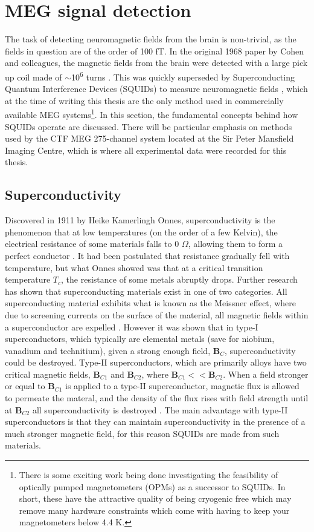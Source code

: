 \section{MEG signal detection}\label{sec_SQUIDS}
The task of detecting neuromagnetic fields from the brain is non-trivial, as the fields in question are of the order of 100 fT. In the original 1968 paper by Cohen and colleagues, the magnetic fields from the brain were detected with a large pick up coil made of $\sim$10\textsuperscript{6} turns \citep{Cohen1968}. This was quickly superseded by Superconducting Quantum Interference Devices (SQUIDs) to measure neuromagnetic fields \citep{Cohen1972}, which at the time of writing this thesis are the only method used in commercially available MEG systems\footnote{There is some exciting work being done investigating the feasibility of optically pumped magnetometers (OPMs) as a successor to SQUIDs. In short, these have the attractive quality of being cryogenic free which may remove many hardware constraints which come with having to keep your magnetometers below 4.4 K.}. In this section, the fundamental concepts behind how SQUIDs operate are discussed. There will be particular emphasis on methods used by the CTF MEG 275-channel system located at the Sir Peter Mansfield Imaging Centre, which is where all experimental data were recorded for this thesis.  

\subsection{Superconductivity}
Discovered in 1911 by Heike Kamerlingh Onnes, superconductivity is the phenomenon that at low temperatures (on the order of a few Kelvin), the electrical resistance of some materials falls to 0 $\Omega$, allowing them to form a perfect conductor \citep{Onnes1911}. It had been postulated that resistance gradually fell with temperature, but what Onnes showed was that at a critical transition temperature $T_c$, the resistance of some metals abruptly drops. Further research has shown that superconducting materials exist in one of two categories. All superconducting material exhibits what is known as the Meissner effect, where due to screening currents on the surface of the material, all magnetic fields within a superconductor are expelled \citep{Meissner1933}. However it was shown that in type-I superconductors, which typically are elemental metals (save for niobium, vanadium and technitium), given a strong enough field, $\mathbf{B}_C$, superconductivity could be destroyed. Type-II superconductors, which are primarily alloys have two critical magnetic fields, $\mathbf{B}_{C1}$ and $\mathbf{B}_{C2}$, where $\mathbf{B}_{C1} << \mathbf{B}_{C2}$. When a field stronger or equal to $\mathbf{B}_{C1}$ is applied to a type-II superconductor, magnetic flux is allowed to permeate the materal, and the density of the flux rises with field strength until at $\mathbf{B}_{C2}$ all superconductivity is destroyed \citep{Rjabinin1935}. The main advantage with type-II superconductors is that they can maintain superconductivity in the presence of a much stronger magnetic field, for this reason SQUIDs are made from such materials.      

